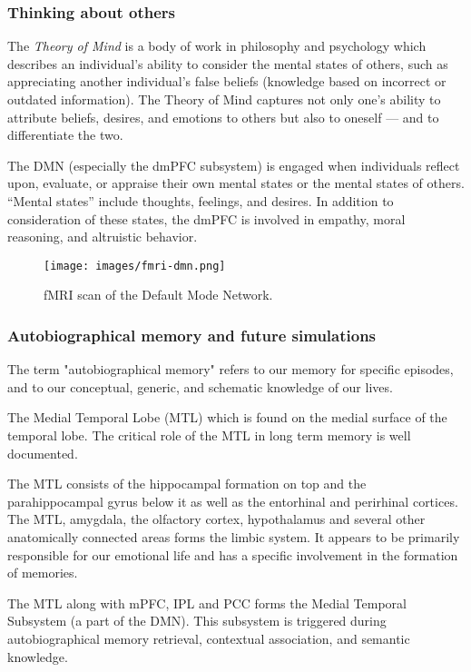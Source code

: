 \documentclass[a4paper, amsfonts, amssymb, amsmath, reprint, showkeys, nofootinbib, twoside]{revtex4-1}
\begin{document}
\subsubsection{Thinking about others}

The \textit{Theory of Mind} is a body of work in philosophy and psychology which
describes an individual's ability to consider the mental states of others, such as
appreciating another individual's false beliefs (knowledge based on incorrect or
outdated information). The Theory of Mind captures not only one's ability to
attribute beliefs, desires, and emotions to others but also to oneself --- and to
differentiate the two. \cite{autistictheoryofmind}

The DMN (especially the dmPFC subsystem) is engaged when individuals reflect upon,
evaluate, or appraise their own mental states or the mental states of others. ``Mental
states'' include thoughts, feelings, and desires. \cite{theoryofmind} In addition to
consideration of these states, the dmPFC is involved in empathy, moral reasoning,
and altruistic behavior. \cite{defaultnetworkadaptive,dmpfcothers,dmpfcaltruism}

\begin{figure}[H]
  \centering
  \texttt{[image: images/fmri-dmn.png]}
  \caption{fMRI scan of the Default Mode Network.}
  \label{fig:fmri-dmn}
\end{figure}

\subsubsection{Autobiographical memory and future simulations}

The term "autobiographical memory" refers to our memory for specific episodes,
and to our conceptual, generic, and schematic knowledge of our lives.

The Medial Temporal Lobe (MTL) which is found on the medial surface of the temporal lobe.
The critical role of the MTL in long term memory is well documented. \cite{mtl}

The MTL consists of the hippocampal formation on top and the parahippocampal gyrus below it as well as
the entorhinal and perirhinal cortices.
The MTL, amygdala, the olfactory cortex, hypothalamus and several other
anatomically connected areas forms the limbic system. It appears to be primarily responsible for
our emotional life and has a specific involvement in the formation of memories. \cite{limbic}

The MTL along with mPFC, IPL and PCC forms the Medial Temporal Subsystem (a part of the DMN).
This subsystem is triggered during autobiographical memory retrieval,
contextual association, and semantic knowledge. \cite{defaultnetworkadaptive}
\end{document}
